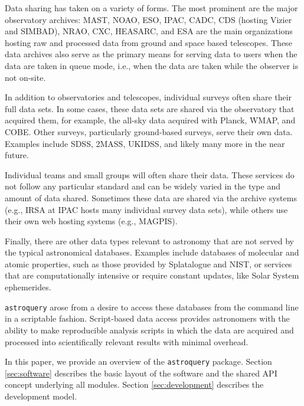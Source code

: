 \documentclass[twocolumn]{aastex61}
\newcommand{\package}[1]{\texttt{#1}\xspace}
\newcommand{\astroquery}{\package{astroquery}}
\begin{document}
Data sharing has taken on a variety of forms.  The most prominent are the major
observatory archives: MAST, NOAO, ESO, IPAC, CADC, CDS (hosting Vizier and
SIMBAD), NRAO, CXC, HEASARC, and ESA are the main
organizations hosting raw and processed data from ground and space based
telescopes.  These data archives also serve as the primary means for serving data
to users when the data are taken in queue mode, i.e., when the data are taken
while the observer is not on-site.

In addition to observatories and telescopes, individual surveys often share
their full data sets.  In some cases, these data sets are shared via the
observatory that acquired them, for example, the all-sky data acquired with
Planck, WMAP, and COBE.  Other surveys, particularly ground-based surveys,
serve their own data.  Examples include SDSS, 2MASS, UKIDSS, and likely many
more in the near future.

Individual teams and small groups will often share their data.
These services do not follow any particular standard and can be widely
varied in the type and amount of data shared.  Sometimes these data
are shared via the archive systems (e.g., IRSA at IPAC hosts many
individual survey data sets), while others use their own web hosting
systems (e.g., MAGPIS).

Finally, there are other data types relevant to astronomy that are not
served by the typical astronomical databases.  Examples include databases of
molecular and atomic properties, such as those provided by Splatalogue and
NIST, or services that are computationally intensive or require constant
updates, like Solar System ephemerides.  

\astroquery arose from a desire to access these databases from the command line
in a scriptable fashion.  Script-based data access provides astronomers with
the ability to make reproducible analysis scripts in which the data are
acquired and processed into scientifically relevant results with minimal
overhead.

In this paper, we provide an overview of the \astroquery package.
Section \ref{sec:software} describes the basic layout of the software and
the shared API concept underlying all modules.  Section \ref{sec:development}
describes the development model.

\end{document}
